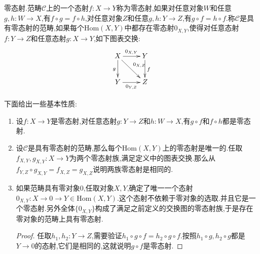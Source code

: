 零态射.范畴$\mathscr{C}$上的一个态射$f:X\to Y$称为零态射,如果对任意对象$W$和任意$g,h:W\to X$,有$f\circ g=f\circ h$,对任意对象$Z$和任意$g,h:Y\to Z$,有$g\circ f=h\circ f$.称$\mathscr{C}$是具有零态射的范畴,如果每个$\mathrm{Hom}(X,Y)$中都存在零态射$0_{X,Y}$,使得对任意态射$f:Y\to Z$和任意态射$g:X\to Y$,如下图表交换:
$$\xymatrix{X\ar[r]^{0_{X,Y}}\ar[dr]^{0_{X,Z}}\ar[d]_g&Y\ar[d]^f\\Y\ar[r]_{0_{Y,Z}}&Z}$$

下面给出一些基本性质:
\begin{enumerate}
	\item 设$f:X\to Y$是零态射,对任意态射$g:Y\to Z$和$h:W\to X$,有$g\circ f$和$f\circ h$都是零态射.
	\item 设$\mathscr{C}$是具有零态射的范畴,那么每个$\mathrm{Hom}(X,Y)$上的零态射是唯一的.任取$f_{X,Y},g_{X,Y}:X\to Y$为两个零态射族,满足定义中的图表交换.那么从$f_{Y,Z}\circ g_{X,Y}=f_{X,Z}=g_{X,Z}$说明两族零态射是相同的.
	\item 如果范畴具有零对象0,任取对象$X,Y$,确定了唯一一个态射$0_{X,Y}:X\to0\to Y\in\mathrm{Hom}(X,Y)$.这个态射不依赖于零对象的选取.并且它是一个零态射.另外全体$\{0_{X,Y}\}$构成了满足之前定义的交换图的零态射族,于是存在零对象的范畴上具有零态射.
	\begin{proof}
		
		任取$h_1,h_2:Y\to Z$,需要验证$h_1\circ g\circ f=h_2\circ g\circ f$.按照$h_1\circ g,h_2\circ g$都是$Y\to0$的态射,它们是相同的,这就说明$g\circ f$是零态射.
	\end{proof}
\end{enumerate}

